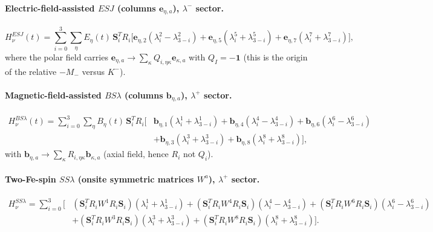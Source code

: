 \documentclass[11pt,a4paper]{article}
\newcommand{\ve}[1]{\boldsymbol{#1}}
\begin{document}
\paragraph{Electric-field-assisted $E S J$ (columns $\ve e_{\eta,a}$), $\lambda^-$ sector.}
\begin{equation}
  H^{ESJ}_\nu(t)=\sum_{i=0}^3\sum_\eta E_\eta(t)\,\ve S_i^TR_i
  \big[\ve e_{\eta,2}(\lambda_i^2-\lambda_{3-i}^2)
  +\ve e_{\eta,5}(\lambda_i^5+\lambda_{3-i}^5)
  +\ve e_{\eta,7}(\lambda_i^7+\lambda_{3-i}^7)\big],
\end{equation}
where the polar field carries $\ve e_{\eta,a}\!\to\!\sum_\kappa Q_{i,\eta\kappa}\ve e_{\kappa,a}$
with $Q_I=-\mathbf1$ (this is the origin of the relative $-M_-$ versus $K^-$).

\paragraph{Magnetic-field-assisted $B S\lambda$ (columns $\ve b_{\eta,a}$), $\lambda^+$ sector.}
\begin{equation}
\begin{aligned}
  H^{BS\lambda}_\nu(t)=\sum_{i=0}^3\sum_\eta B_\eta(t)\,\ve S_i^TR_i\Big[
  &\ve b_{\eta,1}(\lambda_i^1+\lambda_{3-i}^1)
  +\ve b_{\eta,4}(\lambda_i^4-\lambda_{3-i}^4)
  +\ve b_{\eta,6}(\lambda_i^6-\lambda_{3-i}^6)\\[-2pt]
  &+\ve b_{\eta,3}(\lambda_i^3+\lambda_{3-i}^3)
  +\ve b_{\eta,8}(\lambda_i^8+\lambda_{3-i}^8)\Big],
\end{aligned}
\end{equation}
with $\ve b_{\eta,a}\!\to\!\sum_\kappa R_{i,\eta\kappa}\ve b_{\kappa,a}$
(axial field, hence $R_i$ not $Q_i$).

\paragraph{Two-Fe-spin $S S\lambda$ (onsite symmetric matrices $W^a$), $\lambda^+$ sector.}
\begin{equation}
\begin{aligned}
  H^{SS\lambda}_\nu=\sum_{i=0}^3\Big[
  &(\ve S_i^TR_iW^1R_i\ve S_i)(\lambda_i^1+\lambda_{3-i}^1)
  +(\ve S_i^TR_iW^4R_i\ve S_i)(\lambda_i^4-\lambda_{3-i}^4)
  +(\ve S_i^TR_iW^6R_i\ve S_i)(\lambda_i^6-\lambda_{3-i}^6)\\[-2pt]
  &+(\ve S_i^TR_iW^3R_i\ve S_i)(\lambda_i^3+\lambda_{3-i}^3)
  +(\ve S_i^TR_iW^8R_i\ve S_i)(\lambda_i^8+\lambda_{3-i}^8)\Big].
\end{aligned}
\end{equation}
\end{document}
